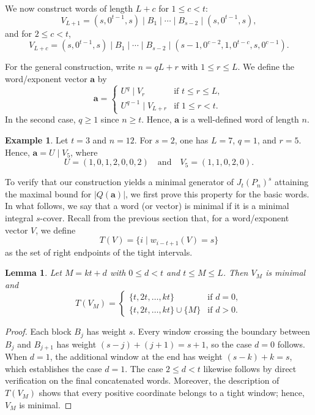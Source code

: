 \documentclass[12pt]{amsart}
\newtheorem{lemma}[theorem]{Lemma}
\theoremstyle{definition}
\newtheorem{example}[theorem]{Example}
\theoremstyle{remark}
\numberwithin{equation}{section}
\begin{document}
We now construct words of length $L + c$ for $1 \le c < t$:
\[
V_{L+1} = (s, 0^{t-1}, s) \mid B_1 \mid \cdots \mid B_{s-2} \mid (s, 0^{t-1}, s),
\]
and for $2 \le c < t$,
\[
V_{L+c} = (s, 0^{t-1}, s) \mid B_1 \mid \cdots \mid B_{s-2} \mid (s-1, 0^{c-2}, 1, 0^{t-c}, s, 0^{c-1}).
\]

For the general construction, write $n = qL + r$ with $1 \le r \le L$. We define the word/exponent vector $\mathbf{a}$ by
\begin{equation}\label{eq:construction}
\mathbf{a} = \begin{cases} 
U^q \mid V_r & \text{if } t \le r \le L, \\ 
U^{q-1} \mid V_{L+r} & \text{if } 1 \le r < t. 
\end{cases}
\end{equation}
In the second case, $q \ge 1$ since $n \ge t$. Hence, $\mathbf{a}$ is a well-defined word of length $n$.

\begin{example}\label{ex:n12}
Let $t = 3$ and $n = 12$. For $s = 2$, one has $L = 7$, $q = 1$, and $r = 5$. Hence, $\mathbf{a} = U \mid V_5$, where
\[
U = (1, 0, 1, 2, 0, 0, 2) \quad \text{and} \quad V_5 = (1, 1, 0, 2, 0).
\]
\end{example}

To verify that our construction yields a minimal generator of $J_t(P_n)^s$ attaining the maximal bound for $|Q(\mathbf{a})|$, we first prove this property for the basic words. In what follows, we say that a word (or vector) is minimal if it is a minimal integral $s$-cover. Recall from the previous section that, for a word/exponent vector $V$, we define
\[
T(V) = \{i \mid w_{i-t+1}(V) = s\}
\]
as the set of right endpoints of the tight intervals.

\begin{lemma}\label{lem:word_1}
Let $M = kt + d$ with $0 \le d < t$ and $t \le M \le L$. Then $V_M$ is minimal and
\[
T(V_M) = \begin{cases}
\{t, 2t, \ldots, kt\} & \text{if } d = 0, \\
\{t, 2t, \ldots, kt\} \cup \{M\} & \text{if } d > 0.
\end{cases}
\]
\end{lemma}

\begin{proof}
Each block $B_j$ has weight $s$. Every window crossing the boundary between $B_j$ and $B_{j+1}$ has weight $(s - j) + (j+1) = s + 1$, so the case $d = 0$ follows. When $d = 1$, the additional window at the end has weight $(s - k) + k = s$, which establishes the case $d = 1$. The case $2 \le d < t$ likewise follows by direct verification on the final concatenated words. Moreover, the description of $T(V_M)$ shows that every positive coordinate belongs to a tight window; hence, $V_M$ is minimal.
\end{proof}
\end{document}

